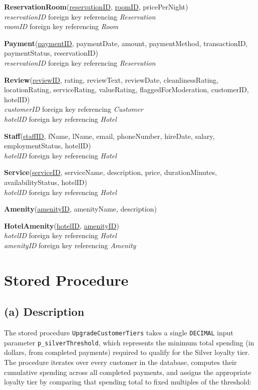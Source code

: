 \documentclass[12pt,letterpaper]{article}
\begin{document}
\textbf{ReservationRoom}(\underline{reservationID}, \underline{roomID}, pricePerNight)\\
\textit{reservationID} foreign key referencing \textit{Reservation}\\
\textit{roomID} foreign key referencing \textit{Room}

\textbf{Payment}(\underline{paymentID}, paymentDate, amount, paymentMethod, transactionID, paymentStatus, reservationID)\\
\textit{reservationID} foreign key referencing \textit{Reservation}

\textbf{Review}(\underline{reviewID}, rating, reviewText, reviewDate, cleanlinessRating, locationRating, serviceRating, valueRating, flaggedForModeration, customerID, hotelID)\\
\textit{customerID} foreign key referencing \textit{Customer}\\
\textit{hotelID} foreign key referencing \textit{Hotel}

\textbf{Staff}(\underline{staffID}, fName, lName, email, phoneNumber, hireDate, salary, employmentStatus, hotelID)\\
\textit{hotelID} foreign key referencing \textit{Hotel}

\textbf{Service}(\underline{serviceID}, serviceName, description, price, durationMinutes, availabilityStatus, hotelID)\\
\textit{hotelID} foreign key referencing \textit{Hotel}

\textbf{Amenity}(\underline{amenityID}, amenityName, description)

\textbf{HotelAmenity}(\underline{hotelID}, \underline{amenityID})\\
\textit{hotelID} foreign key referencing \textit{Hotel}\\
\textit{amenityID} foreign key referencing \textit{Amenity}

\section{Stored Procedure}

\subsection*{(a) Description}

The stored procedure \texttt{UpgradeCustomerTiers} takes a single \texttt{DECIMAL} input parameter \texttt{p\_silverThreshold}, which represents the minimum total spending (in dollars, from completed payments) required to qualify for the Silver loyalty tier. The procedure iterates over every customer in the database, computes their cumulative spending across all completed payments, and assigns the appropriate loyalty tier by comparing that spending total to fixed multiples of the threshold:
\end{document}
